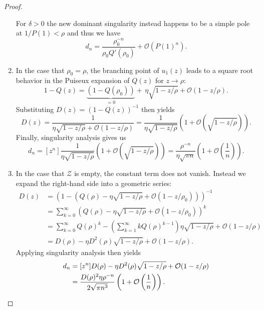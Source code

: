 \begin{proof}
\begin{enumerate}
    For $\delta > 0$ the new dominant singularity instead happens to be a simple pole at $1/P(1) < \rho$ and thus we have
    $$
    d_n = \frac{\rho_0^{-n}}{\rho_0Q'(\rho_0)} + \mathcal{O}(P(1)^n).
    $$
    \item In the case that $\rho_0 = \rho$, the branching point of $u_1(z)$ leads to a square root behavior in the Puiseux expansion of $Q(z)$ for $z \to \rho$:
    $$
    1 - Q(z) = \underbrace{(1 - Q(\rho_0))}_{=0} +\, \eta\sqrt{1 - z/\rho} + \mathcal{O}(1 - z/\rho).
    $$
    Substituting $D(z) = (1-Q(z))^{-1}$ then yields
    \begin{equation*}
      D(z) = \frac{1}{\eta\sqrt{1 - z/\rho} + \mathcal{O}(1 - z/\rho)}
      = \frac{1}{\eta\sqrt{1 - z/\rho}}\left(1 + \mathcal{O}\left(\sqrt{1 - z/\rho}\right)\right).
    \end{equation*}
    Finally, singularity analysis gives us
    $$
      d_n = [z^n]\frac{1}{\eta\sqrt{1 - z/\rho}}\left(1 + \mathcal{O}\left(\sqrt{1 - z/\rho}\right)\right)
      = \frac{\rho^{-n}}{\eta\sqrt{\pi n}}\left(1 + \mathcal{O}\left(\frac{1}{n}\right)\right).
    $$
    \item In the case that $\mathcal{Z}$ is empty, the constant term does not vanish. Instead we expand the right-hand side into a geometric series:
    \begin{align*}
      D(z) &= \left(1 - \left(Q(\rho) - \eta\sqrt{1 - z/\rho} + \mathcal{O}(1-z/\rho_0)\right)\right)^{-1} \\
      &= \sum_{k = 0}^\infty \left(Q(\rho) - \eta\sqrt{1 - z/\rho} + \mathcal{O}(1-z/\rho_0)\right)^k \\
      &= \sum_{k=0}^\infty Q(\rho)^k - 
      \left(
        \sum_{k=1}^\infty k Q(\rho)^{k-1}
      \right)  
      \eta\sqrt{1 - z/\rho} + \mathcal{O}(1-z/\rho) \\
      &= D(\rho) -\eta D^2(\rho)\sqrt{1 - z/\rho} + \mathcal{O}(1-z/\rho).
    \end{align*}
    Applying singularity analysis then yields
    \begin{align*}
      d_n &= [z^n]D(\rho) -\eta D^2(\rho)\sqrt{1 - z/\rho} + \mathcal{O}(1-z/\rho) \\ 
      &= \frac{D(\rho)^2\eta \rho^{-n}}{2\sqrt{\pi n^3}}\left(1 + \mathcal{O}\left(\frac{1}{n}\right)\right). \qedhere
    \end{align*}
  \end{enumerate}
\end{proof}

